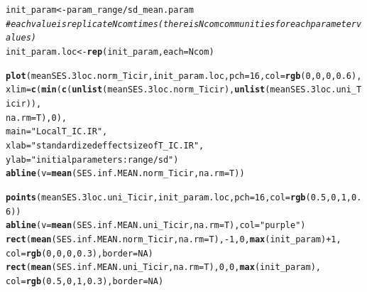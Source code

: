 \documentclass[12pt]{article}\usepackage[]{graphicx}\usepackage[]{color}
\makeatletter
\newcommand{\hlnum}[1]{\textcolor[rgb]{0.686,0.059,0.569}{#1}}%
\newcommand{\hlstr}[1]{\textcolor[rgb]{0.192,0.494,0.8}{#1}}%
\newcommand{\hlcom}[1]{\textcolor[rgb]{0.678,0.584,0.686}{\textit{#1}}}%
\newcommand{\hlopt}[1]{\textcolor[rgb]{0,0,0}{#1}}%
\newcommand{\hlstd}[1]{\textcolor[rgb]{0.345,0.345,0.345}{#1}}%
\newcommand{\hlkwb}[1]{\textcolor[rgb]{0.69,0.353,0.396}{#1}}%
\newcommand{\hlkwc}[1]{\textcolor[rgb]{0.333,0.667,0.333}{#1}}%
\newcommand{\hlkwd}[1]{\textcolor[rgb]{0.737,0.353,0.396}{\textbf{#1}}}%
\newenvironment{kframe}{%
 \def\at@end@of@kframe{}%
 \ifinner\ifhmode%
  \def\at@end@of@kframe{\end{minipage}}%
  \begin{minipage}{\columnwidth}%
 \fi\fi%
 \def\FrameCommand##1{\hskip\@totalleftmargin \hskip-\fboxsep
 \colorbox{shadecolor}{##1}\hskip-\fboxsep
     \hskip-\linewidth \hskip-\@totalleftmargin \hskip\columnwidth}%
 \MakeFramed {\advance\hsize-\width
   \@totalleftmargin\z@ \linewidth\hsize
   \@setminipage}}%
 {\par\unskip\endMakeFramed%
 \at@end@of@kframe}
\newenvironment{knitrout}{}{} %
\makeatother
\begin{document}
\begin{knitrout}\small
{}\color{fgcolor}\begin{kframe}
\begin{alltt}
\hlstd{init_param} \hlkwb{<-} \hlstd{param_range} \hlopt{/} \hlstd{sd_mean.param}
\hlcom{#each value is replicate Ncom times (there is Ncom communities for each parameter values)}
\hlstd{init_param.loc} \hlkwb{<-} \hlkwd{rep}\hlstd{(init_param,} \hlkwc{each} \hlstd{= Ncom)}

\hlkwd{plot}\hlstd{(meanSES.3loc.norm_Ticir, init_param.loc,} \hlkwc{pch} \hlstd{=} \hlnum{16}\hlstd{,} \hlkwc{col} \hlstd{=} \hlkwd{rgb}\hlstd{(}\hlnum{0}\hlstd{,} \hlnum{0}\hlstd{,} \hlnum{0}\hlstd{,} \hlnum{0.6}\hlstd{),}
     \hlkwc{xlim} \hlstd{=} \hlkwd{c}\hlstd{(}\hlkwd{min}\hlstd{(}\hlkwd{c}\hlstd{(}\hlkwd{unlist}\hlstd{(meanSES.3loc.norm_Ticir),} \hlkwd{unlist}\hlstd{(meanSES.3loc.uni_Ticir)),}
     \hlkwc{na.rm} \hlstd{= T),} \hlnum{0}\hlstd{),}
     \hlkwc{main} \hlstd{=} \hlstr{"Local T_IC.IR"}\hlstd{,}
     \hlkwc{xlab} \hlstd{=} \hlstr{"standardized effect size of T_IC.IR"}\hlstd{,}
     \hlkwc{ylab} \hlstd{=} \hlstr{"initial parameters: range/sd"}\hlstd{)}
\hlkwd{abline}\hlstd{(}\hlkwc{v} \hlstd{=} \hlkwd{mean}\hlstd{(SES.inf.MEAN.norm_Ticir,} \hlkwc{na.rm} \hlstd{= T))}

\hlkwd{points}\hlstd{(meanSES.3loc.uni_Ticir, init_param.loc,} \hlkwc{pch} \hlstd{=} \hlnum{16}\hlstd{,} \hlkwc{col} \hlstd{=} \hlkwd{rgb}\hlstd{(}\hlnum{0.5}\hlstd{,} \hlnum{0}\hlstd{,} \hlnum{1}\hlstd{,} \hlnum{0.6}\hlstd{))}
\hlkwd{abline}\hlstd{(}\hlkwc{v} \hlstd{=} \hlkwd{mean}\hlstd{(SES.inf.MEAN.uni_Ticir,} \hlkwc{na.rm} \hlstd{= T),} \hlkwc{col} \hlstd{=} \hlstr{"purple"}\hlstd{)}
\hlkwd{rect}\hlstd{(}\hlkwd{mean}\hlstd{(SES.inf.MEAN.norm_Ticir,} \hlkwc{na.rm} \hlstd{= T),} \hlopt{-}\hlnum{1}\hlstd{,} \hlnum{0}\hlstd{,} \hlkwd{max}\hlstd{(init_param)} \hlopt{+} \hlnum{1}\hlstd{,}
     \hlkwc{col} \hlstd{=} \hlkwd{rgb}\hlstd{(}\hlnum{0}\hlstd{,} \hlnum{0}\hlstd{,} \hlnum{0}\hlstd{,} \hlnum{0.3}\hlstd{),} \hlkwc{border} \hlstd{=} \hlnum{NA}\hlstd{)}
\hlkwd{rect}\hlstd{(}\hlkwd{mean}\hlstd{(SES.inf.MEAN.uni_Ticir,} \hlkwc{na.rm} \hlstd{= T),}\hlnum{0}\hlstd{,} \hlnum{0}\hlstd{,} \hlkwd{max}\hlstd{(init_param),}
     \hlkwc{col} \hlstd{=} \hlkwd{rgb}\hlstd{(}\hlnum{0.5}\hlstd{,} \hlnum{0}\hlstd{,} \hlnum{1}\hlstd{,} \hlnum{0.3}\hlstd{),} \hlkwc{border} \hlstd{=} \hlnum{NA}\hlstd{)}
\end{alltt}
\end{kframe}\begin{figure}


\end{figure}
\end{knitrout}
\end{document}
